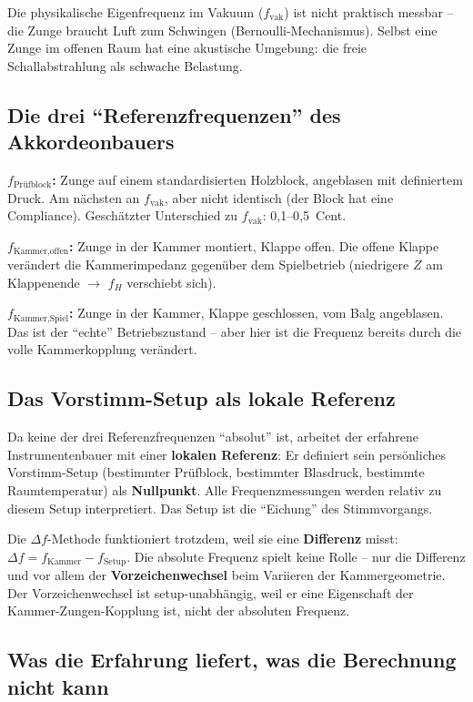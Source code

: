 \documentclass[11pt,a4paper]{article}
\begin{document}
Die physikalische Eigenfrequenz im Vakuum ($f_\text{vak}$) ist nicht praktisch messbar -- die Zunge braucht Luft zum Schwingen (Bernoulli-Mechanismus). Selbst eine Zunge im offenen Raum hat eine akustische Umgebung: die freie Schallabstrahlung als schwache Belastung.

\subsection{Die drei ``Referenzfrequenzen'' des Akkordeonbauers}

\textbf{$f_\text{Prüfblock}$:} Zunge auf einem standardisierten Holzblock, angeblasen mit definiertem Druck. Am nächsten an $f_\text{vak}$, aber nicht identisch (der Block hat eine Compliance). Geschätzter Unterschied zu $f_\text{vak}$: 0{,}1--0{,}5~Cent.

\textbf{$f_\text{Kammer,offen}$:} Zunge in der Kammer montiert, Klappe offen. Die offene Klappe verändert die Kammerimpedanz gegenüber dem Spielbetrieb (niedrigere $Z$ am Klappenende $\to$ $f_H$ verschiebt sich).

\textbf{$f_\text{Kammer,Spiel}$:} Zunge in der Kammer, Klappe geschlossen, vom Balg angeblasen. Das ist der ``echte'' Betriebszustand -- aber hier ist die Frequenz bereits durch die volle Kammerkopplung verändert.

\subsection{Das Vorstimm-Setup als lokale Referenz}

Da keine der drei Referenzfrequenzen ``absolut'' ist, arbeitet der erfahrene Instrumentenbauer mit einer \textbf{lokalen Referenz}: Er definiert sein persönliches Vorstimm-Setup (bestimmter Prüfblock, bestimmter Blasdruck, bestimmte Raumtemperatur) als \textbf{Nullpunkt}. Alle Frequenzmessungen werden relativ zu diesem Setup interpretiert. Das Setup ist die ``Eichung'' des Stimmvorgangs.

Die $\Delta f$-Methode funktioniert trotzdem, weil sie eine \textbf{Differenz} misst: $\Delta f = f_\text{Kammer} - f_\text{Setup}$. Die absolute Frequenz spielt keine Rolle -- nur die Differenz und vor allem der \textbf{Vorzeichenwechsel} beim Variieren der Kammergeometrie. Der Vorzeichenwechsel ist setup-unabhängig, weil er eine Eigenschaft der Kammer-Zungen-Kopplung ist, nicht der absoluten Frequenz.

\subsection{Was die Erfahrung liefert, was die Berechnung nicht kann}
\end{document}
